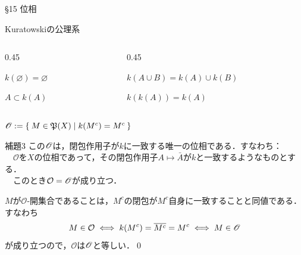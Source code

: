 \documentclass[uplatex,a4paper,dvipdfmx,aspectratio=169,11pt]{beamer}
\begin{document}
\newcommand{\Ocal}{\mathcal{O}}
\begin{frame}[fragile]{\S 15 位相}
    \begin{block}{Kuratowskiの公理系}
        \vspace{-0.5em}
        \begin{columns}
            \begin{column}{0.45\textwidth}
                \begin{description}[$\textbf{K}_1$:]
                    \item[$\textbf{K}_1$:] $k(\varnothing) = \varnothing$
                    \item[$\textbf{K}_2$:] $A \subset k(A)$
                \end{description}
            \end{column}
            \begin{column}{0.45\textwidth}
                \begin{description}[$\textbf{K}_1$:]
                    \item[$\textbf{K}_3$:] $k(A \cup B) = k(A) \cup k(B)$
                    \item[$\textbf{K}_4$:] $k(k(A)) = k(A)$
                \end{description}
            \end{column}
        \end{columns}
    \end{block}
    $\mathscr{O} := \Set{ M \in {\mathord{\mathfrak{P}}\qty(X)} | k(M^c) = M^c}$

    \begin{block}{補題3}
        この$\mathscr{O}$は，閉包作用子が$k$に一致する唯一の位相である．すなわち：\\

        \smallskip{}
        　$\Ocal$を$X$の位相であって，その閉包作用子$A \mapsto \bar A$が$k$と一致するようなものとする．\\
        　このとき$\Ocal = \Opens$が成り立つ．
    \end{block}

    $M$が$\Ocal$-開集合であることは，$M^c$の閉包が$M^c$自身に一致することと同値である．すなわち
    \begin{equation*}
        M \in \Ocal \iff k(M^c) = \overline{M^c} = M^c \iff M \in \Opens
    \end{equation*}
    が成り立つので，$\Ocal$は$\mathscr{O}$と等しい．\qed
\end{frame}
\end{document}
